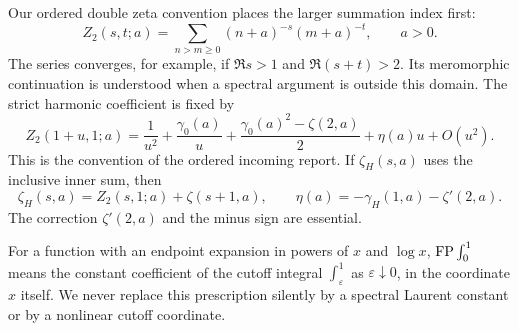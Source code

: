 Our ordered double zeta convention places the larger summation index
first:
\begin{equation}\label{eq:Z2def}
 Z_2(s,t;a)=\sum_{n>m\ge0}(n+a)^{-s}(m+a)^{-t},\qquad a>0.
\end{equation}
The series converges, for example, if $\Re s>1$ and
$\Re(s+t)>2$. Its meromorphic continuation is understood when a
spectral argument is outside this domain. The strict harmonic coefficient
is fixed by
\begin{equation}\label{eq:eta-definition}
 Z_2(1+u,1;a)=\frac1{u^2}+\frac{\gamma_0(a)}u+
 \frac{\gamma_0(a)^2-\zeta(2,a)}2+\eta(a)u+O(u^2).
\end{equation}
This is the convention of the ordered incoming report. If
$\zeta_H(s,a)$ uses the inclusive inner sum, then
\begin{equation}\label{eq:strict-inclusive}
 \zeta_H(s,a)=Z_2(s,1;a)+\zeta(s+1,a),\qquad
 \eta(a)=-\gamma_H(1,a)-\zeta'(2,a).
\end{equation}
The correction $\zeta'(2,a)$ and the minus sign are essential.

For a function with an endpoint expansion in powers of $x$ and
$\log x$, $\operatorname{FP}\int_0^1$ means the constant coefficient of the cutoff
integral $\int_\varepsilon^1$ as $\varepsilon\downarrow0$, in the
coordinate $x$ itself. We never replace this prescription silently
by a spectral Laurent constant or by a nonlinear cutoff coordinate.
